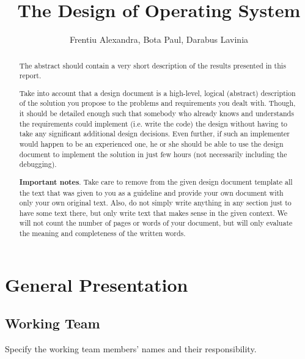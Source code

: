 \documentclass[a4paper,12pt]{report}
\title{The Design of \OSName{} Operating System}
\author{Frentiu Alexandra, Bota Paul, Darabus Lavinia}
\begin{document}


\maketitle

\begin{abstract}
The abstract should contain a very short description of the results presented in this report. 

Take into account that a design document is a high-level, logical (abstract) description of the solution you propose to the problems and requirements you dealt with. Though, it should be detailed enough such that somebody who already knows and understands the requirements could implement (i.e. write the code) the design without having to take any significant additional design decisions. Even further, if such an implementer would happen to be an experienced one, he or she should be able to use the design document to implement the solution in just few hours (not necessarily including the debugging). 

\textbf{Important notes}. Take care to remove from the given design document template all the text that was given to you as a guideline and provide your own document with only your own original text. Also, do not simply write anything in any section just to have some text there, but only write text that makes sense in the given context. We will not count the number of pages or words of your document, but will only evaluate the meaning and completeness of the written words. 
\end{abstract}


\chapter{General Presentation}

\section{Working Team}

Specify the working team members' names and their responsibility.
\end{document}
